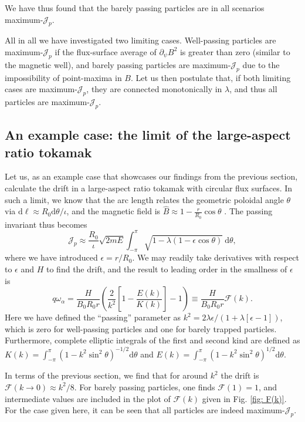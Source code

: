 We have thus found that the barely passing particles are in all scenarios maximum-$\mathcal{J}_p$. \par 
All in all we have investigated two limiting cases. Well-passing particles are maximum-$\mathcal{J}_p$ if the flux-surface average of $\partial_\psi B^2$ is greater than zero (similar to the magnetic well), and barely passing particles are maximum-$\mathcal{J}_p$ due to the impossibility of point-maxima in $B$. Let us then postulate that, if both limiting cases are maximum-$\mathcal{J}_p$, they are connected monotonically in $\lambda$, and thus all particles are maximum-$\mathcal{J}_p$.

\subsection*{An example case: the limit of the large-aspect ratio tokamak}
Let us, as an example case that showcases our findings from the previous section, calculate the drift in a large-aspect ratio tokamak with circular flux surfaces. In such a limit, we know that the arc length relates the geometric poloidal angle $\theta$ via $\mathrm{d}\ell \approx R_0 \mathrm{d} \theta / \iota$, and the magnetic field is $\hat{B} \approx 1 - \frac{r}{R_0} \cos \theta$ \cite{helander2005collisional}. The passing invariant thus becomes
\begin{equation}
    \mathcal{J}_p \approx \frac{R_0}{\iota} \sqrt{2mE} \int_{-\pi}^{\pi} \sqrt{1 - \lambda (1 - \epsilon\cos \theta)} \: \mathrm{d} \theta,
\end{equation}
where we have introduced $\epsilon = r/R_0$. We may readily take derivatives with respect to $\epsilon$ and $H$ to find the drift, and the result to leading order in the smallness of $\epsilon$ is
\begin{equation}
    q \omega_\alpha = \frac{H}{B_0 R_0 r} \left(\frac{2}{k^2} \left[1 - \frac{E(k)}{K(k)} \right] - 1 \right) \equiv \frac{H}{B_0 R_0 r} \mathcal{F}(k).
\end{equation}
Here we have defined the ``passing'' parameter as $k^2 = 2 \lambda \epsilon / ( 1 + \lambda [ \epsilon - 1 ] )$, which is zero for well-passing particles and one for barely trapped particles. Furthermore, complete elliptic integrals of the first and second kind are defined as $K(k) = \int_{-\pi}^{\pi} (1 - k^2 \sin^2 \theta)^{-1/2} \mathrm{d} \theta$ and $E(k) = \int_{-\pi}^{\pi} (1 - k^2 \sin^2 \theta)^{1/2} \mathrm{d} \theta$. \par 
In terms of the previous section, we find that for around $k^2$ the drift is $\mathcal{F}(k \rightarrow 0) \approx k^2 / 8$. For barely passing particles, one finds $\mathcal{F}(1) = 1$, and intermediate values are included in the plot of $\mathcal{F}(k)$ given in Fig. \ref{fig: F(k)}. For the case given here, it can be seen that all particles are indeed maximum-$\mathcal{J}_p$.
